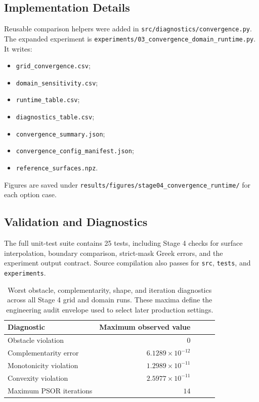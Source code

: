 \documentclass[11pt]{article}
\begin{document}
\subsection{Implementation Details}
Reusable comparison helpers were added in \texttt{src/diagnostics/convergence.py}. The expanded experiment is \texttt{experiments/03\_convergence\_domain\_runtime.py}. It writes:
\begin{itemize}
  \item \texttt{grid\_convergence.csv};
  \item \texttt{domain\_sensitivity.csv};
  \item \texttt{runtime\_table.csv};
  \item \texttt{diagnostics\_table.csv};
  \item \texttt{convergence\_summary.json};
  \item \texttt{convergence\_config\_manifest.json};
  \item \texttt{reference\_surfaces.npz}.
\end{itemize}

Figures are saved under \texttt{results/figures/stage04\_convergence\_runtime/} for each option case.

\subsection{Validation and Diagnostics}
The full unit-test suite contains 25 tests, including Stage 4 checks for surface interpolation, boundary comparison, strict-mask Greek errors, and the experiment output contract. Source compilation also passes for \texttt{src}, \texttt{tests}, and \texttt{experiments}.

\begin{table}[h]
\centering
\begin{tabular}{lrrrr}
\toprule
Diagnostic & Maximum observed value\\
\midrule
Obstacle violation & $0$\\
Complementarity error & $6.1289\times10^{-12}$\\
Monotonicity violation & $1.2989\times10^{-11}$\\
Convexity violation & $2.5977\times10^{-11}$\\
Maximum PSOR iterations & $14$\\
\bottomrule
\end{tabular}
\caption{Worst obstacle, complementarity, shape, and iteration diagnostics across all Stage 4 grid and domain runs. These maxima define the engineering audit envelope used to select later production settings.}
\end{table}
\end{document}
